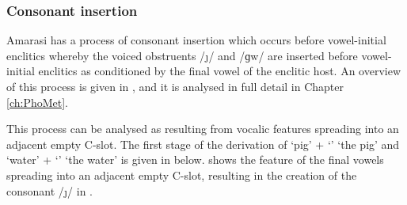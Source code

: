 \subsubsection{Consonant insertion}\label{sec:EmpCSloConIns}
Amarasi has a process of consonant insertion
which occurs before vowel-initial enclitics
whereby the voiced obstruents /\j/ and /ɡw/ are inserted
before vowel-initial enclitics as conditioned
by the final vowel of the enclitic host.
An overview of this process is given in ,
and it is analysed in full detail in Chapter \ref{ch:PhoMet}.

This process can be analysed as resulting from
vocalic features spreading into an adjacent empty C-slot.
The first stage of the derivation of  `pig' +
 `{\ee}' {\ra}  `the pig'
and  `water' +  `{\ee}' {\ra}  `the water'
is given in  below.
 shows the feature  of
the final vowels spreading into an adjacent empty C-slot,
resulting in the creation of the consonant /\j/ in .

